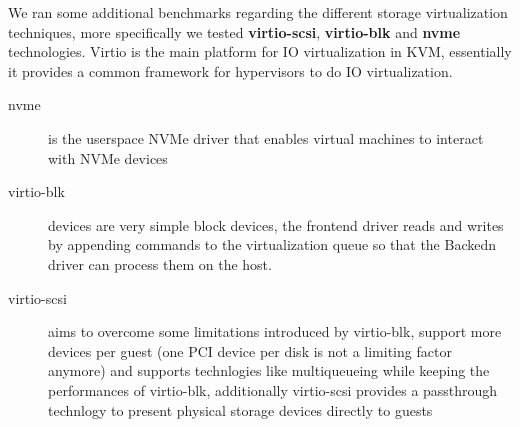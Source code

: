 \documentclass[twocolumn]{article}
\begin{document}
    We ran some additional benchmarks regarding the different storage virtualization techniques, more specifically we tested \textbf{virtio-scsi}, 
    \textbf{virtio-blk} and \textbf{nvme} technologies. Virtio is the main platform for IO virtualization in KVM, essentially it provides a common framework for hypervisors to do IO virtualization.

    \begin{description}
        \item[nvme] is the userspace NVMe driver that enables virtual machines to interact with NVMe devices
        \item[virtio-blk] devices are very simple block devices, the frontend driver reads and writes by appending commands to the virtualization queue so that the Backedn driver can process them on the host.
        \item[virtio-scsi] aims to overcome some limitations introduced by virtio-blk, support more devices per guest (one PCI device per disk is not a limiting factor anymore) and supports technlogies like multiqueueing while keeping the performances of virtio-blk, additionally virtio-scsi provides a passthrough technlogy to present physical storage devices directly to guests
    \end{description}
\end{document}
